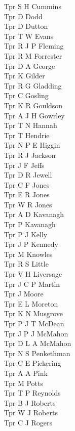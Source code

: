 \begin{multicols}{4}
  Tpr S H Cummins \\
  Tpr D Dodd \\
  Tpr D Dutton \\
  Tpr T W Evans \\
  Tpr R J P Fleming \\
  Tpr R M Forrester \\
  Tpr D A George \\
  Tpr K Gilder \\
  Tpr R G Gladding \\
  Tpr C Gosling \\
  Tpr K R Gouldson \\
  Tpr A J H Gowrley \\
  Tpr T N Hannah \\
  Tpr T Hendrie \\
  Tpr N P E Higgin \\
  Tpr R J Jackson \\
  Tpr J F Jeffs \\
  Tpr D R Jewell \\
  Tpr C F Jones \\
  Tpr E R Jones \\
  Tpr W R Jones \\
  Tpr A D Kavanagh \\
  Tpr P Kavanagh \\
  Tpr P J Kelly \\
  Tpr J P Kennedy \\
  Tpr M Knowles \\
  Tpr R S Little \\
  Tpr V H Liversage \\
  Tpr J C P Martin \\
  Tpr J Moore \\
  Tpr E L Moreton \\
  Tpr K N Musgrove \\
  Tpr P J T McDean \\
  Tpr J P J McMahon \\
  Tpr D L A McMahon \\
  Tpr N S Penkethman \\
  Tpr C E Pickering \\
  Tpr A A Pink \\
  Tpr M Potts \\
  Tpr T P Reynolds \\
  Tpr B J Roberts \\
  Tpr W J Roberts \\
  Tpr C J Rogers \\

\end{multicols}
